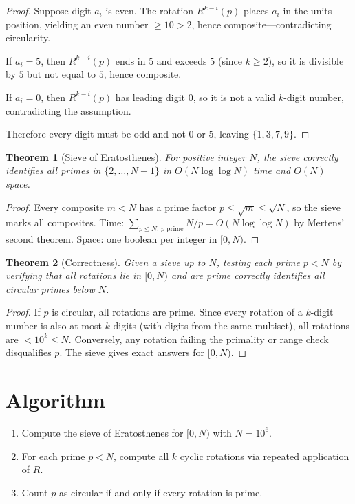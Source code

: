 \documentclass[12pt]{article}
\newtheorem{theorem}{Theorem}
\theoremstyle{definition}
\begin{document}
\begin{proof}
Suppose digit $a_i$ is even. The rotation $R^{k-i}(p)$ places $a_i$ in the units position, yielding an even number $\ge 10 > 2$, hence composite---contradicting circularity.

If $a_i = 5$, then $R^{k-i}(p)$ ends in $5$ and exceeds $5$ (since $k \ge 2$), so it is divisible by $5$ but not equal to $5$, hence composite.

If $a_i = 0$, then $R^{k-i}(p)$ has leading digit $0$, so it is not a valid $k$-digit number, contradicting the assumption.

Therefore every digit must be odd and not $0$ or $5$, leaving $\{1, 3, 7, 9\}$.
\end{proof}

\begin{theorem}[Sieve of Eratosthenes]
For positive integer $N$, the sieve correctly identifies all primes in $\{2, \ldots, N-1\}$ in $O(N \log \log N)$ time and $O(N)$ space.
\end{theorem}

\begin{proof}
Every composite $m < N$ has a prime factor $p \le \sqrt{m} \le \sqrt{N}$, so the sieve marks all composites. Time: $\sum_{p \le N,\, p \text{ prime}} N/p = O(N \log \log N)$ by Mertens' second theorem. Space: one boolean per integer in $[0, N)$.
\end{proof}

\begin{theorem}[Correctness]
Given a sieve up to $N$, testing each prime $p < N$ by verifying that all rotations lie in $[0, N)$ and are prime correctly identifies all circular primes below $N$.
\end{theorem}

\begin{proof}
If $p$ is circular, all rotations are prime. Since every rotation of a $k$-digit number is also at most $k$ digits (with digits from the same multiset), all rotations are $< 10^k \le N$. Conversely, any rotation failing the primality or range check disqualifies $p$. The sieve gives exact answers for $[0, N)$.
\end{proof}

\section{Algorithm}
\begin{enumerate}
\item Compute the sieve of Eratosthenes for $[0, N)$ with $N = 10^6$.
\item For each prime $p < N$, compute all $k$ cyclic rotations via repeated application of $R$.
\item Count $p$ as circular if and only if every rotation is prime.
\end{enumerate}
\end{document}
